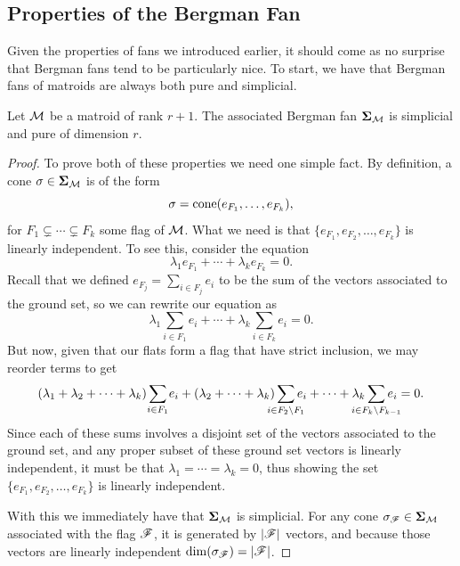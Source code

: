 \documentclass[12pt,oneside]{../../sfsuthesis}
\begin{document}
\subsection{Properties of the Bergman Fan}
Given the properties of fans we introduced earlier, it should come as no surprise that Bergman fans tend to be particularly nice.
To start, we have that Bergman fans of matroids are always both pure and simplicial.
\begin{proposition}\th\label{thm:bergFanSimPure}
    Let \( \mathcal{M} \) be a matroid of rank \( r + 1 \).
    The associated Bergman fan \( {\bm{\Sigma}}_{\mathcal{M}} \) is simplicial and pure of dimension \( r \).
\end{proposition}
\begin{proof}
    To prove both of these properties we need one simple fact.
    By definition, a cone \( \sigma \in {\bm{\Sigma}}_{\mathcal{M}} \) is of the form
    \[
        \sigma = \mathrm{cone}( e_{F_1}, \dots, e_{F_k} ),
    \]
    for \( F_1 \subsetneq \cdots \subsetneq F_k \) some flag of \( \mathcal{M} \).
    What we need is that \( \{e_{F_1}, e_{F_2}, \dots, e_{F_k} \} \) is linearly independent.
    To see this, consider the equation
    \[
        \lambda_{1}e_{F_1} + \cdots + \lambda_{k}e_{F_{k}} = 0.
    \]
    Recall that we defined \( e_{F_j} = \sum_{i \in F_{j} } e_i \) to be the sum of the vectors associated to the ground set, so we can rewrite our equation as
    \[
        \lambda_{1}\sum_{i \in F_{1} } e_i + \cdots + \lambda_{k}\sum_{i \in F_{k} } e_i = 0.
    \]
    But now, given that our flats form a flag that have strict inclusion, we may reorder terms to get
    \[
        (\lambda_1 + \lambda_2 + \cdots + \lambda_k) \sum_{\mathclap{i \in F_1}} e_i
        + (\lambda_2 + \cdots + \lambda_k) \sum_{\mathclap{i \in F_2 \setminus F_1}} e_i
        + \cdots
        + \lambda_k \sum_{\mathclap{i \in F_k \setminus F_{k-1}}} e_i  = 0.
    \]
    Since each of these sums involves a disjoint set of the vectors associated to the ground set, and any proper subset of these ground set vectors is linearly independent, it must be that \( \lambda_1 = \cdots = \lambda_k = 0 \), thus showing the set \( \{e_{F_1}, e_{F_2}, \dots, e_{F_k} \} \) is linearly independent.

    With this we immediately have that \( {\bm{\Sigma}}_{\mathcal{M}} \) is simplicial.
    For any cone \( \sigma_{\mathscr{F}} \in {\bm{\Sigma}}_{\mathcal{M}} \) associated with the flag \( \mathscr{F} \), it is generated by \( |\mathscr{F}| \) vectors, and because those vectors are linearly independent \( \dim(\sigma_{\mathscr{F}}) = |\mathscr{F}| \).


\end{proof}
\end{document}
